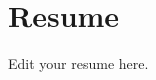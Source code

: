 \documentclass[11pt,a4paper]{article}
\begin{document}
\section{Resume}
Edit your resume here.
\end{document}
